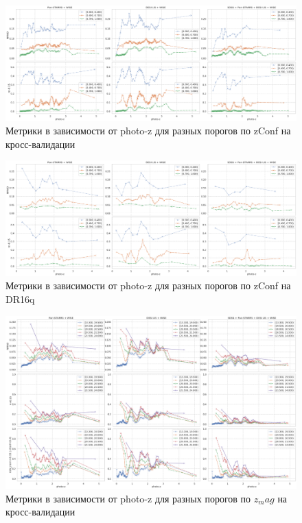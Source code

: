 \documentclass[fleqn,usenatbib]{mnras}
\begin{document}
\begin{landscape}
\begin{figure}
    \centering
    \includegraphics[width=25cm]{images/metrics-adv-photoz-x-zconf-cv2.png}
    \caption{Метрики в зависимости от photo-z для разных порогов по zConf на кросс-валидации}
    \label{fig:my_label}
\end{figure}
\end{landscape}


\begin{landscape}
\begin{figure}
    \centering
    \includegraphics[width=0.9\linewidth]{images/metrics-adv-photoz-x-zconf-dr16q.png}
    \caption{Метрики в зависимости от photo-z для разных порогов по zConf на DR16q}
    \label{fig:my_label}
\end{figure}
\end{landscape}


\begin{landscape}
\begin{figure}
    \centering
    \includegraphics[width=0.9\linewidth]{images/metrics-adv-photoz-x-zmag-cv2.png}
    \caption{Метрики в зависимости от photo-z для разных порогов по $z_mag$ на кросс-валидации}
    \label{fig:my_label}
\end{figure}
\end{landscape}
\end{document}

